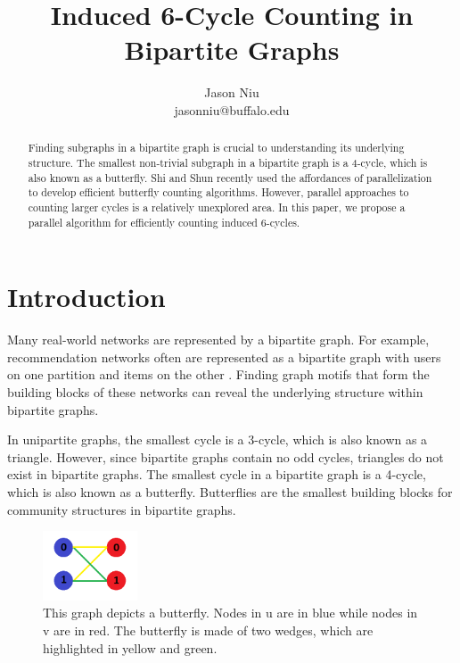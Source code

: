 \documentclass[11pt]{article}
\title{Induced 6-Cycle Counting in Bipartite Graphs}
\begin{document}
 
\author{
Jason Niu \\
jasonniu@buffalo.edu
}
\date{}

\maketitle

\begin{abstract}
Finding subgraphs in a bipartite graph is crucial to understanding its underlying structure.
The smallest non-trivial subgraph in a bipartite graph is a 4-cycle, which is also known as a butterfly.
Shi and Shun recently used the affordances of parallelization to develop efficient butterfly counting algorithms.
However, parallel approaches to counting larger cycles is a relatively unexplored area.
In this paper, we propose a parallel algorithm for efficiently counting induced 6-cycles.
\end{abstract}

\section{Introduction}
Many real-world networks are represented by a bipartite graph.
For example, recommendation networks often are represented as a bipartite graph with users on one partition and items on the other \cite{li2013recommendation}.
Finding graph motifs that form the building blocks of these networks can reveal the underlying structure within bipartite graphs.

In unipartite graphs, the smallest cycle is a 3-cycle, which is also known as a triangle.
However, since bipartite graphs contain no odd cycles, triangles do not exist in bipartite graphs.
The smallest cycle in a bipartite graph is a 4-cycle, which is also known as a butterfly.
Butterflies are the smallest building blocks for community structures in bipartite graphs.

\begin{figure}[h]
    \centering
    \includegraphics[width=0.25\textwidth]{figures/Butterfly.png}
    \caption{\small This graph depicts a butterfly. Nodes in u are in blue while nodes in v are in red. The butterfly is made of two wedges, which are highlighted in yellow and green.}
    \label{fig:butterfly}
\end{figure}
\end{document}
